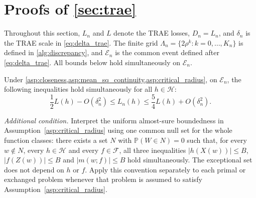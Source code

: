 \section[Proofs for TRAE]{Proofs of \cref{sec:trae}}

Throughout this section, $L_n$ and $L$ denote the TRAE losses, $D_n=L_n$, and $\delta_n$ is the TRAE scale in \eqref{eq:delta_trae}. The finite grid $\Lambda_n=\{2\rho^k:k=0,\ldots,K_n\}$ is defined in \cref{alg:discrepancy}, and $\mathcal E_n$ is the common event defined after \eqref{eq:delta_trae}. All bounds below hold simultaneously on $\mathcal E_n$.

\begin{lemma}\label{lemma:concentrate_l}
Under \cref{asp:closeness,asp:mean_sq_continuity,asp:critical_radius}, on $\mathcal E_n$, the following inequalities hold simultaneously for all $h\in\mathcal H$:
\[
\frac{1}{2} L( h) -O\left( \delta _{n}^{2}\right) \leqslant L_{n}( h) \leqslant \frac{5}{4} L( h) +O\left( \delta _{n}^{2}\right) .
\]

\emph{Additional condition.} Interpret the uniform almost-sure boundedness in Assumption~\ref{asp:critical_radius} using one common null set for the whole function classes: there exists a set $N$ with $\mathbb P(W\in N)=0$ such that, for every $w\notin N$, every $h\in\mathcal H$ and every $f\in\mathcal F$, all three inequalities $|h(X(w))|\leqslant B$, $|f(Z(w))|\leqslant B$ and $|m(w;f)|\leqslant B$ hold simultaneously. The exceptional set does not depend on $h$ or $f$. Apply this convention separately to each primal or exchanged problem whenever that problem is assumed to satisfy Assumption~\ref{asp:critical_radius}.
\end{lemma}

